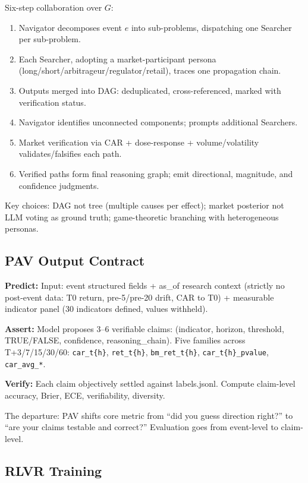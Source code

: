 \documentclass[sigconf, anonymous, review]{acmart}
\begin{document}
Six-step collaboration over $G$:
\begin{enumerate}
    \item Navigator decomposes event $e$ into sub-problems, dispatching one Searcher per sub-problem.
    \item Each Searcher, adopting a market-participant persona (long/short/arbitrageur/regulator/retail), traces one propagation chain.
    \item Outputs merged into DAG: deduplicated, cross-referenced, marked with verification status.
    \item Navigator identifies unconnected components; prompts additional Searchers.
    \item Market verification via CAR + dose-response + volume/volatility validates/falsifies each path.
    \item Verified paths form final reasoning graph; emit directional, magnitude, and confidence judgments.
\end{enumerate}

Key choices: DAG not tree (multiple causes per effect); market posterior not LLM voting as ground truth; game-theoretic branching with heterogeneous personas.

\subsection{PAV Output Contract}

\textbf{Predict:} Input: event structured fields + as\_of research context (strictly no post-event data: T0 return, pre-5/pre-20 drift, CAR to T0) + measurable indicator panel (30 indicators defined, values withheld).

\textbf{Assert:} Model proposes 3--6 verifiable claims: (indicator, horizon, threshold, TRUE/FALSE, confidence, reasoning\_chain). Five families across T+3/7/15/30/60: \texttt{car\_t\{h\}}, \texttt{ret\_t\{h\}}, \texttt{bm\_ret\_t\{h\}}, \texttt{car\_t\{h\}\_pvalue}, \texttt{car\_avg\_*}.

\textbf{Verify:} Each claim objectively settled against labels.jsonl. Compute claim-level accuracy, Brier, ECE, verifiability, diversity.

The departure: PAV shifts core metric from ``did you guess direction right?'' to ``are your claims testable and correct?'' Evaluation goes from event-level to claim-level.

\subsection{RLVR Training}
\end{document}

